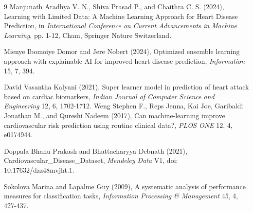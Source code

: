 \documentclass[twoside]{article}
\begin{document}
\begin{thebibliography}{9}
Manjunath Aradhya V. N., Shiva Prasad P., and Chaithra C. S. (2024), Learning with Limited Data: A Machine Learning Approach for Heart Disease Prediction, in {\it International Conference on Current Advancements in Machine Learning}, pp. 1-12, Cham, Springer Nature Switzerland.

Mienye Ibomoiye Domor and Jere Nobert (2024), Optimized ensemble learning approach with explainable AI for improved heart disease prediction, {\it Information} 15, 7, 394.

David Vasantha Kalyani (2021), Super learner model in prediction of heart attack based on cardiac biomarkers, {\it Indian Journal of Computer Science and Engineering} 12, 6, 1702-1712.
Weng Stephen F., Reps Jenna, Kai Joe, Garibaldi Jonathan M., and Qureshi Nadeem (2017), Can machine-learning improve cardiovascular risk prediction using routine clinical data?, {\it PLOS ONE} 12, 4, e0174944.



Doppala Bhanu Prakash and Bhattacharyya Debnath (2021), Cardiovascular\_Disease\_Dataset, {\it Mendeley Data} V1, doi: 10.17632/dzz48mvjht.1.



Sokolova Marina and Lapalme Guy (2009), A systematic analysis of performance measures for classification tasks, {\it Information Processing \& Management} 45, 4, 427-437.



\end{thebibliography}

%
 
\end{document}

